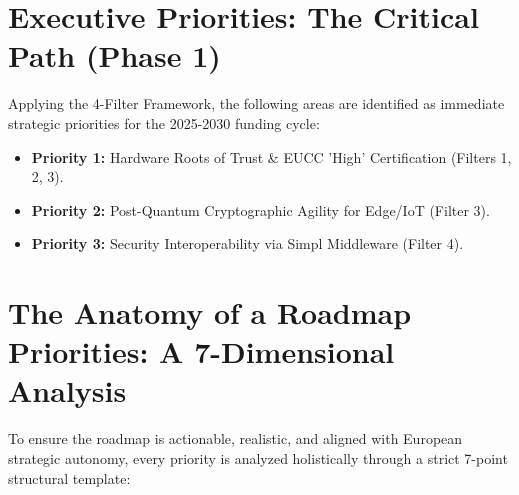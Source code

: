 \documentclass[12pt,a4paper]{article}
\begin{document}
\section*{Executive Priorities: The Critical Path (Phase 1)}
Applying the 4-Filter Framework, the following areas are identified as immediate strategic priorities for the 2025-2030 funding cycle:
\begin{itemize}
    \item \textbf{Priority 1:} Hardware Roots of Trust \& EUCC 'High' Certification (Filters 1, 2, 3).
    \item \textbf{Priority 2:} Post-Quantum Cryptographic Agility for Edge/IoT (Filter 3).
    \item \textbf{Priority 3:} Security Interoperability via Simpl Middleware (Filter 4).
\end{itemize}

\section{The Anatomy of a Roadmap Priorities: A 7-Dimensional Analysis}
To ensure the roadmap is actionable, realistic, and aligned with European strategic autonomy, every priority is analyzed holistically through a strict 7-point structural template:
\end{document}

